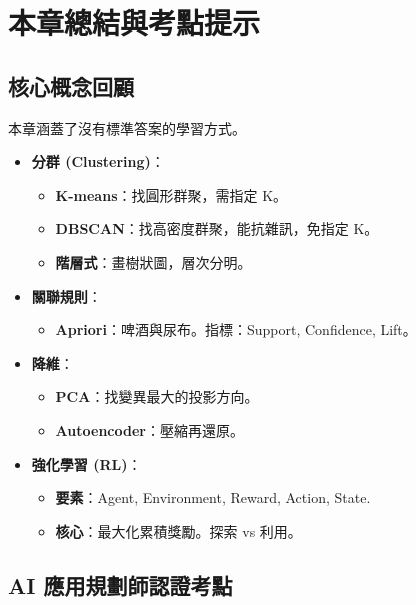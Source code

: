 \documentclass[
  letterpaper,
  DIV=11,
  numbers=noendperiod]{scrreprt}
\providecommand{\tightlist}{%
  \setlength{\itemsep}{0pt}\setlength{\parskip}{0pt}}
\begin{document}
\chapter{本章總結與考點提示}\label{sec-chapter6-summary}

\section{核心概念回顧}\label{ux6838ux5fc3ux6982ux5ff5ux56deux9867-5}

本章涵蓋了沒有標準答案的學習方式。

\begin{itemize}
\tightlist
\item
  \textbf{分群 (Clustering)}：

  \begin{itemize}
  \tightlist
  \item
    \textbf{K-means}：找圓形群聚，需指定 K。
  \item
    \textbf{DBSCAN}：找高密度群聚，能抗雜訊，免指定 K。
  \item
    \textbf{階層式}：畫樹狀圖，層次分明。
  \end{itemize}
\item
  \textbf{關聯規則}：

  \begin{itemize}
  \tightlist
  \item
    \textbf{Apriori}：啤酒與尿布。指標：Support, Confidence, Lift。
  \end{itemize}
\item
  \textbf{降維}：

  \begin{itemize}
  \tightlist
  \item
    \textbf{PCA}：找變異最大的投影方向。
  \item
    \textbf{Autoencoder}：壓縮再還原。
  \end{itemize}
\item
  \textbf{強化學習 (RL)}：

  \begin{itemize}
  \tightlist
  \item
    \textbf{要素}：Agent, Environment, Reward, Action, State.
  \item
    \textbf{核心}：最大化累積獎勵。探索 vs 利用。
  \end{itemize}
\end{itemize}

\section{AI
應用規劃師認證考點}\label{ai-ux61c9ux7528ux898fux5283ux5e2bux8a8dux8b49ux8003ux9ede-5}
\end{document}
